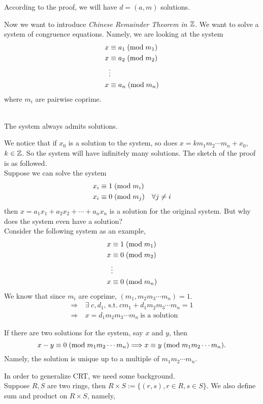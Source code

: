 \begin{remark}
According to the proof, we will have $d=(a,m)$ solutions.
\end{remark}
Now we want to introduce \emph{Chinese Remainder Theorem in $\mathbb{Z}$}. We want to solve a system of congruence equations. Namely, we are looking at the system
\begin{align*}
x&\equiv a_1\;(\mbox{mod}{\;m_1})\\
x&\equiv a_2\;(\mbox{mod}{\;m_2})\\
&\vdots\\
x&\equiv a_n\;(\mbox{mod}{\;m_n})
\end{align*}
where $m_i$ are pairwise coprime.
\begin{theorem}\mbox{}\\
The system always admits solutions.
\end{theorem}
 We notice that if $x_0$ is a solution to the system, so does $x=km_1m_2\cdots m_n+x_0$, $k\in\mathbb{Z}$. So the system will have infinitely many solutions. The sketch of the proof is as followed.\\ Suppose we can solve the system
\begin{align*}
x_i&\equiv 1\;(\mbox{mod}{\;m_i})\\
x_i&\equiv 0\;(\mbox{mod}{\;m_j})\quad\forall j\ne i
\end{align*}
then $x=a_1x_1+a_2x_2+\cdots+a_nx_n$ is a solution for the original system. But why does the system even have a solution?\\
Consider the following system as an example,
\begin{align*}
x&\equiv 1\;(\mbox{mod}{\;m_1})\\
x&\equiv 0\;(\mbox{mod}{\;m_2})\\
&\vdots\\
x&\equiv 0\;(\mbox{mod}{\;m_n})
\end{align*}
We know that since $m_i$ are coprime, $(m_1,m_2m_3\cdots m_n) = 1$.
\begin{align*}
\Rightarrow &\ \exists\;c,d_1,\,\mbox{s.t.}\  cm_1+d_1m_2m_3\cdots m_n = 1\\
\Rightarrow &\ x=d_1m_2m_3\cdots m_n\ \mbox{is a solution}
\end{align*}
\begin{remark}
If there are two solutions for the system, say $x$ and $y$, then $$x-y\equiv 0\;(\mbox{mod}{\;m_1m_2\cdots m_n})\Longrightarrow x\equiv y\;(\mbox{mod}{\;m_1m_2\cdots m_n}).$$ Namely, the solution is unique up to a multiple of $m_1m_2\cdots m_n$. 
\end{remark}
In order to generalize CRT, we need some background.\\
Suppose $R, S$ are two rings, then $R\times S := \{(r,s), r\in R, s\in S\}$. We also define sum and product on $R\times S$, namely,
